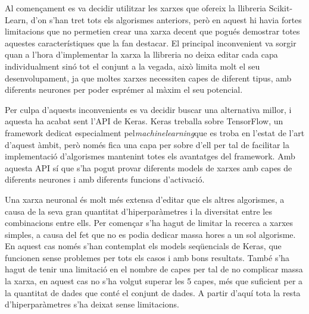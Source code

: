 \documentclass[10pt,a4paper,twocolumn,twoside]{article}
\begin{document}
Al començament es va decidir utilitzar les xarxes que ofereix la llibreria Scikit-Learn, d'on s'han tret tots els algorismes anteriors, però en aquest hi havia fortes limitacions que no permetien crear una xarxa decent que pogués demostrar totes aquestes característiques que la fan destacar. El principal inconvenient va sorgir quan a l'hora d'implementar la xarxa la llibreria no deixa editar cada capa individualment sinó tot el conjunt a la vegada, això limita molt el seu desenvolupament, ja que moltes xarxes necessiten capes de diferent tipus, amb diferents neurones per poder esprémer al màxim el seu potencial.

Per culpa d'aquests inconvenients es va decidir buscar una alternativa millor, i aquesta ha acabat sent l'API de Keras. Keras treballa sobre TensorFlow, un framework dedicat especialment pel\textit{machinelearning}que es troba en l'estat de l'art d'aquest àmbit, però només fica una capa per sobre d'ell per tal de facilitar la implementació d'algorismes mantenint totes els avantatges del framework. Amb aquesta API sí que s'ha pogut provar diferents models de xarxes amb capes de diferents neurones i amb diferents funcions d'activació.

Una xarxa neuronal és molt més extensa d'editar que els altres algorismes, a causa de la seva gran quantitat d'hiperparàmetres i la diversitat entre les combinacions entre ells. Per començar s'ha hagut de limitar la recerca a xarxes simples, a causa del fet que no es podia dedicar massa hores a un sol algorisme. En aquest cas només s'han contemplat els models seqüencials de Keras, que funcionen sense problemes per tots els casos i amb bons resultats. També s'ha hagut de tenir una limitació en el nombre de capes per tal de no complicar massa la xarxa, en aquest cas no s'ha volgut superar les 5 capes, més que suficient per a la quantitat de dades que conté el conjunt de dades. A partir d'aquí tota la resta d'hiperparàmetres s'ha deixat sense limitacions.
\end{document}
